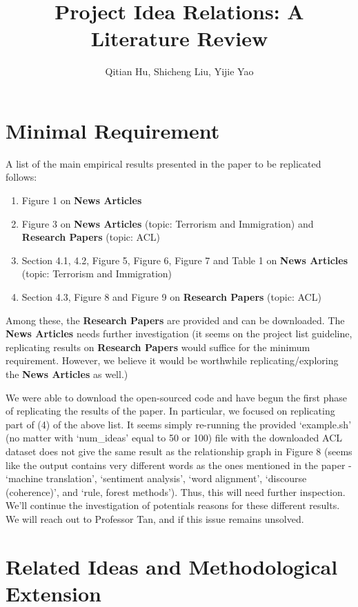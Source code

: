 \documentclass{article}
\title{Project Idea Relations: A Literature Review}
\author{Qitian Hu, Shicheng Liu, Yijie Yao}
\begin{document}
\maketitle 

\section{Minimal Requirement}

A list of the main empirical results presented in the paper to be replicated
\cite{original} follows:

\begin{enumerate}
  \item Figure 1 on \textbf{News Articles}
  \item Figure 3 on \textbf{News Articles} (topic: Terrorism and Immigration)
   and \textbf{Research Papers} (topic: ACL)
  \item Section 4.1, 4.2, Figure 5, Figure 6, Figure 7 and Table 1 on 
  \textbf{News Articles} (topic: Terrorism and Immigration)
  \item Section 4.3, Figure 8 and Figure 9 on \textbf{Research Papers} 
  (topic: ACL)
\end{enumerate}

Among these, the \textbf{Research Papers} are provided and can be downloaded. 
The \textbf{News Articles} needs further investigation (it seems on the 
project list guideline, replicating results on \textbf{Research Papers}
would suffice for the minimum requirement. However, we believe it would be
worthwhile replicating/exploring the \textbf{News Articles} as well.)

We were able to download the open-sourced code and have begun the first phase of replicating
the results of the paper. In particular, we focused on replicating part of (4)
of the above list. It seems simply re-running the provided `example.sh'
(no matter with `num\_ideas' equal to 50 or 100)
file with the downloaded ACL dataset does not give the same result as the
relationship graph in Figure 8 (seems like the output contains very different
words as the ones mentioned in the paper - `machine translation', 
`sentiment analysis', `word alignment', `discourse (coherence)', and 
`rule, forest methods'). Thus, this will need further inspection. We'll continue
the investigation of potentials reasons for these different results. We will reach out to Professor Tan, and if this issue remains unsolved.

\section{Related Ideas and Methodological Extension}
\end{document}
